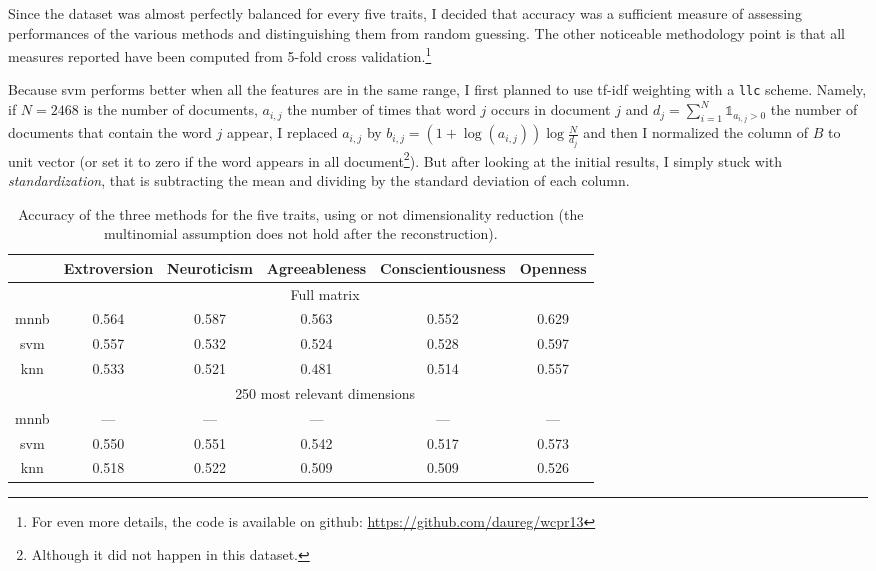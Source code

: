 Since the dataset was almost perfectly balanced for every five traits, I decided that accuracy was a sufficient measure of assessing performances of the various methods and distinguishing them from random guessing. The other noticeable methodology point is that all measures reported have been computed from 5-fold cross validation.\footnote{For even more details, the code is available on github: \href{https://github.com/daureg/wcpr13}{https://github.com/daureg/wcpr13}}

Because \gls{svm} performs better when all the features are in the same range, I first planned to use tf-idf weighting with a \texttt{llc} scheme. Namely, if $N=2468$ is the number of documents, $a_{i,j}$ the number of times that word $j$ occurs in document $j$ and $d_j = \sum_{i=1}^N \mathds{1}_{a_{i,j}>0}$ the number of documents that contain the word $j$ appear, I replaced $a_{i,j}$ by $b_{i,j} = (1+\log(a_{i,j}))\log\frac{N}{d_j}$ and then I normalized the column of $B$ to unit vector (or set it to zero if the word appears in all document\footnote{Although it did not happen in this dataset.}). But after looking at the initial results, I simply stuck with \emph{standardization}, that is subtracting the mean and dividing by the standard deviation of each column.

\begin{table}[hb]
	\begin{adjustwidth}{-2pt}{-2pt}
	\centering
	\begin{tabular}{cccccc}
		\toprule
		& Extroversion & Neuroticism & Agreeableness & Conscientiousness & Openness \tabularnewline
		\midrule
		& \multicolumn{5}{c}{Full matrix} \tabularnewline
		\cmidrule(r){2-6}
		\gls{mnnb} & 0.564 & 0.587 & 0.563 & 0.552 & 0.629 \tabularnewline
   		\gls{svm} & 0.557 & 0.532 & 0.524 & 0.528 & 0.597 \tabularnewline
   		\gls{knn} & 0.533 & 0.521 & 0.481 & 0.514 & 0.557 \tabularnewline
		& \multicolumn{5}{c}{250 most relevant dimensions} \tabularnewline
		\cmidrule(r){2-6}
		\gls{mnnb} & --- & --- & --- & --- & --- \tabularnewline
   		\gls{svm} & 0.550 & 0.551 & 0.542 & 0.517 & 0.573 \tabularnewline
   		\gls{knn} & 0.518 & 0.522 & 0.509 & 0.509 & 0.526 \tabularnewline
		\bottomrule
	\end{tabular}
	\end{adjustwidth}
	\caption{Accuracy of the three methods for the five traits, using or not dimensionality reduction (the multinomial assumption does not hold after the  reconstruction).}
	\label{tab:res}
\end{table}

